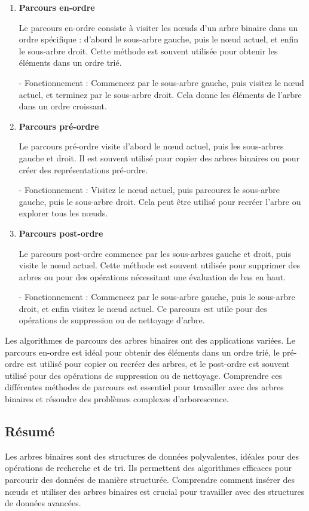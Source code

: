 \begin{enumerate}[label=\alph*)]
	\item \textbf{Parcours en-ordre}
	
	Le parcours en-ordre consiste à visiter les nœuds d'un arbre binaire dans un ordre spécifique : d'abord le sous-arbre gauche, puis le nœud actuel, et enfin le sous-arbre droit. Cette méthode est souvent utilisée pour obtenir les éléments dans un ordre trié.
	
	- Fonctionnement : Commencez par le sous-arbre gauche, puis visitez le nœud actuel, et terminez par le sous-arbre droit. Cela donne les éléments de l'arbre dans un ordre croissant.
	
	\item \textbf{Parcours pré-ordre}
	
	Le parcours pré-ordre visite d'abord le nœud actuel, puis les sous-arbres gauche et droit. Il est souvent utilisé pour copier des arbres binaires ou pour créer des représentations pré-ordre.
	
	- Fonctionnement : Visitez le nœud actuel, puis parcourez le sous-arbre gauche, puis le sous-arbre droit. Cela peut être utilisé pour recréer l'arbre ou explorer tous les nœuds.
	
	\item \textbf{Parcours post-ordre}
	
	Le parcours post-ordre commence par les sous-arbres gauche et droit, puis visite le nœud actuel. Cette méthode est souvent utilisée pour supprimer des arbres ou pour des opérations nécessitant une évaluation de bas en haut.
	
	- Fonctionnement : Commencez par le sous-arbre gauche, puis le sous-arbre droit, et enfin visitez le nœud actuel. Ce parcours est utile pour des opérations de suppression ou de nettoyage d'arbre.
	
\end{enumerate}

Les algorithmes de parcours des arbres binaires ont des applications variées. Le parcours en-ordre est idéal pour obtenir des éléments dans un ordre trié, le pré-ordre est utilisé pour copier ou recréer des arbres, et le post-ordre est souvent utilisé pour des opérations de suppression ou de nettoyage. Comprendre ces différentes méthodes de parcours est essentiel pour travailler avec des arbres binaires et résoudre des problèmes complexes d'arborescence.


\subsection{Résumé}
Les arbres binaires sont des structures de données polyvalentes, idéales pour des opérations de recherche et de tri. Ils permettent des algorithmes efficaces pour parcourir des données de manière structurée. Comprendre comment insérer des nœuds et utiliser des arbres binaires est crucial pour travailler avec des structures de données avancées.

